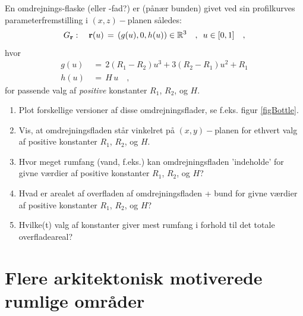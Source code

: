 \begin{exercise} \label{excBottle}
En omdrejnings-flaske (eller -fad?) er (pånær bunden) givet ved sin profilkurves parameterfremstilling
i $(x, z)-$planen således:
\begin{equation}
G_{\bf r} : \quad {\bf r}(u) \, = \, \left(g(u), 0, h(u)\right)
\in \mathbb{R}^3 \quad , \, \, \,  u \in [0, 1] \quad,
\end{equation}
hvor
\begin{equation}
\begin{aligned}
g(u) \, &= \, 2(R_{1} - R_{2})u^{3} + 3(R_{2} - R_{1})u^{2} + R_{1} \\
h(u)\, &= \, H\,u \quad ,
\end{aligned}
\end{equation}
 for passende valg af {\em{positive}} konstanter $R_{1}$, $R_{2}$, og $H$.
\begin{enumerate}
\item Plot forskellige versioner af disse omdrejningsflader, se f.eks. figur \ref{figBottle}.
\item Vis, at omdrejningsfladen står vinkelret på $(x, y)-$planen for ethvert valg af positive konstanter $R_{1}$, $R_{2}$, og $H$.
\item Hvor meget rumfang (vand, f.eks.) kan omdrejningsfladen 'indeholde' for givne værdier af positive konstanter $R_{1}$, $R_{2}$, og $H$?
\item Hvad er arealet af overfladen af omdrejningsfladen + bund for givne værdier af positive konstanter $R_{1}$, $R_{2}$, og $H$?
\item Hvilke(t) valg af konstanter giver mest rumfang i forhold til det totale overfladeareal?
\end{enumerate}
\end{exercise}



\section{Flere arkitektonisk motiverede rumlige områder} \label{subsecAndreLegemer}

